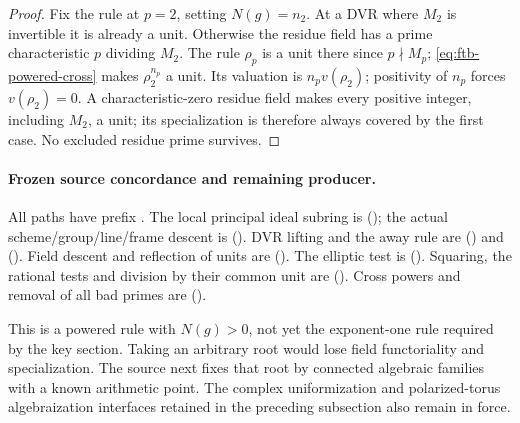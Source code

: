 \begin{proof}
Fix the rule at \(p=2\), setting \(N(g)=n_2\).
At a DVR where \(M_2\) is invertible it is already a unit.
Otherwise the residue field has a prime characteristic \(p\)
dividing \(M_2\).  The rule \(\rho_p\) is a unit there since
\(p\nmid M_p\); \eqref{eq:ftb-powered-cross} makes
\(\rho_2^{n_p}\) a unit.  Its valuation is
\(n_pv(\rho_2)\); positivity of \(n_p\) forces
\(v(\rho_2)=0\).
A characteristic-zero residue field makes every positive integer,
including \(M_2\), a unit; its specialization is therefore always
covered by the first case.  No excluded residue prime survives.
\end{proof}

\paragraph{Frozen source concordance and remaining producer.}
All paths have prefix
.
The local principal ideal subring is
();
the actual scheme/group/line/frame descent is
().
DVR lifting and the away rule are
()
and 
().
Field descent and reflection of units are
().
The elliptic test is
().
Squaring, the rational tests and division by their common unit are
().
Cross powers and removal of all bad primes are
().

This is a powered rule with \(N(g)>0\), not yet the exponent-one
rule required by the key section.  Taking an arbitrary root would
lose field functoriality and specialization.  The source next fixes
that root by connected algebraic families with a known arithmetic
point.  The complex uniformization and polarized-torus
algebraization interfaces retained in the preceding subsection
also remain in force.
